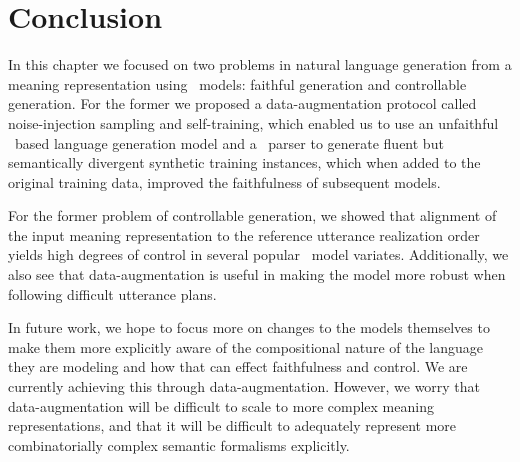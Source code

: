 \section{Conclusion}

In this chapter we focused on two problems in natural language generation
from a meaning representation using \sequencetosequence~models:
faithful generation and controllable generation.
For the former we proposed a data-augmentation protocol called noise-injection
sampling and self-training, which enabled us to use an unfaithful
\sequencetosequence~based language generation model and a \meaningrepresentation~parser to generate fluent but semantically divergent synthetic training
instances, which when added to the original training data, improved
the faithfulness of subsequent models.

For the former problem of controllable generation, we showed that alignment
of the input meaning representation to the reference utterance realization
order yields high degrees of control in several popular \sequencetosequence~model variates. Additionally, we also see that data-augmentation is useful 
in making the model more robust when following difficult utterance plans.

In future work, we hope to focus more on changes to the models themselves
to make them more explicitly aware of the compositional nature of the 
language they are modeling and how that can effect faithfulness and control.
We are currently achieving this through data-augmentation. However, we worry
that data-augmentation will be difficult to scale to more complex meaning
representations, and that it will be difficult to adequately 
represent more combinatorially complex semantic formalisms explicitly.

